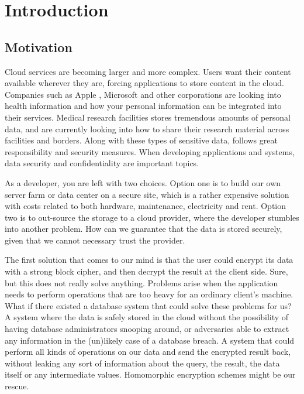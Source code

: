 \chapter{Introduction}
\label{chp:introduction}

\section{Motivation}

Cloud services are becoming larger and more complex. Users want their content available wherever they are, forcing applications to store content in the cloud. Companies such as Apple \cite{apple_health}, Microsoft \cite{microsoft_health} and other corporations are looking into health information and how your personal information can be integrated into their services. Medical research facilities stores tremendous amounts of personal data, and are currently looking into how to share their research material across facilities and borders. Along with these types of sensitive data, follows great responsibility and security measures. When developing applications and systems, data security and confidentiality are important topics.


As a developer, you are left with two choices. Option one is to build our own server farm or data center on a secure site, which is a rather expensive solution with costs related to both hardware, maintenance, electricity and rent. Option two is to out-source the storage to a cloud provider, where the developer stumbles into another problem. How can we guarantee that the data is stored securely, given that we cannot necessary trust the provider.

The first solution that comes to our mind is that the user could encrypt its data with a strong block cipher, and then decrypt the result at the client side. Sure, but this does not really solve anything. Problems arise when the application needs to perform operations that are too heavy for an ordinary client's machine. What if there existed a database system that could solve these problems for us? A system where the data is safely stored in the cloud without the possibility of having database administrators snooping around, or adversaries able to extract any information in the (un)likely case of a database breach. A system that could perform all kinds of operations on our data and send the encrypted result back, without leaking any sort of information about the query, the result, the data itself or any intermediate values. Homomorphic encryption schemes might be our rescue.

